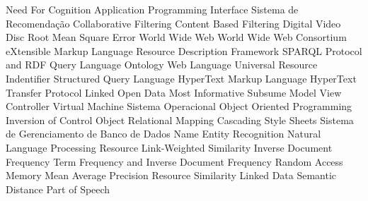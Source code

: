 \begin{acronym}[ACRONYM] 

 {Need For Cognition}
 {Application Programming Interface}
 {Sistema de Recomendação}
 {Collaborative Filtering}
 {Content Based Filtering}
 {Digital Video Disc}
 {Root Mean Square Error}
 {World Wide Web}
 {World Wide Web Consortium}
 {eXtensible Markup Language}
 {Resource Description Framework}
 {SPARQL Protocol and RDF Query Language}
 {Ontology Web Language}
 {Universal Resource Indentifier}
 {Structured Query Language}
 {HyperText Markup Language}
 {HyperText Transfer Protocol}
 {Linked Open Data}
 {Most Informative Subsume}
 {Model View Controller}
 {Virtual Machine}
 {Sistema Operacional}
 {Object Oriented Programming}
 {Inversion of Control}
 {Object Relational Mapping}
 {Cascading Style Sheets}
 {Sistema de Gerenciamento de Banco de Dados}
 {Name Entity Recognition}
 {Natural Language Processing}
 {Resource Link-Weighted Similarity}
 {Inverse Document Frequency}
 {Term Frequency and Inverse Document Frequency}
 {Random Access Memory}
 {Mean Average Precision}
 {Resource Similarity}
 {Linked Data Semantic Distance}
 {Part of Speech}
    
\end{acronym}